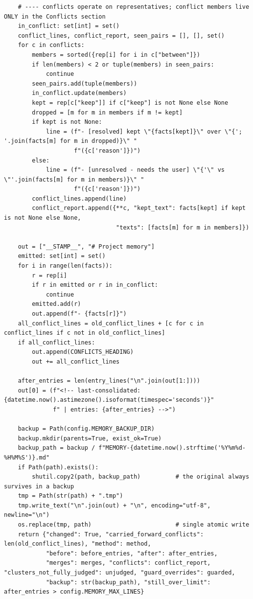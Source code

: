 \documentclass[11pt]{article}
\begin{document}
\begin{lstlisting}
    # ---- conflicts operate on representatives; conflict members live ONLY in the Conflicts section
    in_conflict: set[int] = set()
    conflict_lines, conflict_report, seen_pairs = [], [], set()
    for c in conflicts:
        members = sorted({rep[i] for i in c["between"]})
        if len(members) < 2 or tuple(members) in seen_pairs:
            continue
        seen_pairs.add(tuple(members))
        in_conflict.update(members)
        kept = rep[c["keep"]] if c["keep"] is not None else None
        dropped = [m for m in members if m != kept]
        if kept is not None:
            line = (f"- [resolved] kept \"{facts[kept]}\" over \"{'; '.join(facts[m] for m in dropped)}\" "
                    f"({c['reason']})")
        else:
            line = (f"- [unresolved - needs the user] \"{'\" vs \"'.join(facts[m] for m in members)}\" "
                    f"({c['reason']})")
        conflict_lines.append(line)
        conflict_report.append({**c, "kept_text": facts[kept] if kept is not None else None,
                                "texts": [facts[m] for m in members]})

    out = ["__STAMP__", "# Project memory"]
    emitted: set[int] = set()
    for i in range(len(facts)):
        r = rep[i]
        if r in emitted or r in in_conflict:
            continue
        emitted.add(r)
        out.append(f"- {facts[r]}")
    all_conflict_lines = old_conflict_lines + [c for c in conflict_lines if c not in old_conflict_lines]
    if all_conflict_lines:
        out.append(CONFLICTS_HEADING)
        out += all_conflict_lines

    after_entries = len(entry_lines("\n".join(out[1:])))
    out[0] = (f"<!-- last-consolidated: {datetime.now().astimezone().isoformat(timespec='seconds')}"
              f" | entries: {after_entries} -->")

    backup = Path(config.MEMORY_BACKUP_DIR)
    backup.mkdir(parents=True, exist_ok=True)
    backup_path = backup / f"MEMORY-{datetime.now().strftime('%Y%m%d-%H%M%S')}.md"
    if Path(path).exists():
        shutil.copy2(path, backup_path)          # the original always survives in a backup
    tmp = Path(str(path) + ".tmp")
    tmp.write_text("\n".join(out) + "\n", encoding="utf-8", newline="\n")
    os.replace(tmp, path)                        # single atomic write
    return {"changed": True, "carried_forward_conflicts": len(old_conflict_lines), "method": method,
            "before": before_entries, "after": after_entries,
            "merges": merges, "conflicts": conflict_report, "clusters_not_fully_judged": unjudged, "guard_overrides": guarded,
            "backup": str(backup_path), "still_over_limit": after_entries > config.MEMORY_MAX_LINES}
\end{lstlisting}
\end{document}
